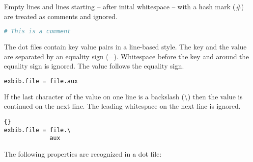 Empty lines and lines starting -- after inital whitespace -- with a
hash mark (\#) are treated as comments and ignored.
\begin{lstlisting}[language=sh]
# This is a comment
\end{lstlisting}

The dot files contain key value pairs in a line-based style. The key
and the value are separated by an equality sign (=). Whitespace before
the key and around the equality sign is ignored. The value follows the
equality sign.
\begin{lstlisting}[language=sh]
exbib.file = file.aux
\end{lstlisting}

If the last character of the value on one line is a backslash
(\textbackslash) then the value is continued on the next line. The
leading whitespace on the next line is ignored.
\begin{lstlisting}{}
exbib.file = file.\
             aux
\end{lstlisting}

The following properties are recognized in a dot file:

